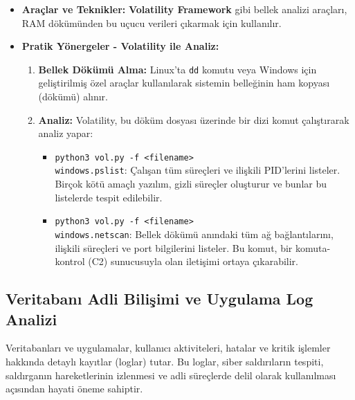 \begin{itemize}
\begin{itemize}
\begin{itemize}
    \item \textbf{Araçlar ve Teknikler:} \textbf{Volatility Framework} gibi bellek analizi araçları, RAM dökümünden bu uçucu verileri çıkarmak için kullanılır.
    \item \textbf{Pratik Yönergeler - Volatility ile Analiz:}
    \begin{enumerate}
        \item \textbf{Bellek Dökümü Alma:} Linux'ta \texttt{dd} komutu veya Windows için geliştirilmiş özel araçlar kullanılarak sistemin belleğinin ham kopyası (dökümü) alınır.
        \item \textbf{Analiz:} Volatility, bu döküm dosyası üzerinde bir dizi komut çalıştırarak analiz yapar:
        \begin{itemize}
            \item \texttt{python3 vol.py -f \textless{}filename\textgreater{} \\ \hspace*{1cm}windows.pslist}: Çalışan tüm süreçleri ve ilişkili PID'lerini listeler. Birçok kötü amaçlı yazılım, gizli süreçler oluşturur ve bunlar bu listelerde tespit edilebilir.
            \item \texttt{python3 vol.py -f \textless{}filename\textgreater{} \\ \hspace*{1cm}windows.netscan}: Bellek dökümü anındaki tüm ağ bağlantılarını, ilişkili süreçleri ve port bilgilerini listeler. Bu komut, bir komuta-kontrol (C2) sunucusuyla olan iletişimi ortaya çıkarabilir.
        \end{itemize}
    \end{enumerate}
\end{itemize}

\subsection{Veritabanı Adli Bilişimi ve Uygulama Log Analizi}

Veritabanları ve uygulamalar, kullanıcı aktiviteleri, hatalar ve kritik işlemler hakkında detaylı kayıtlar (loglar) tutar. Bu loglar, siber saldırıların tespiti, saldırganın hareketlerinin izlenmesi ve adli süreçlerde delil olarak kullanılması açısından hayati öneme sahiptir.


\end{itemize}
\end{itemize}
